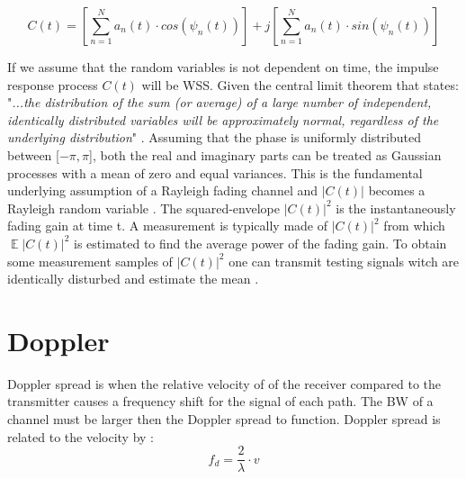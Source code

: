 \begin{equation}\label{eq:inf_reyl_impulse_response}
C(t) = \left [ \sum_{n =1}^{N} a_n(t)\cdot cos(\psi_n (t))\right ] + j\left [\sum_{n =1}^{N} a_n(t)\cdot sin(\psi_n (t))  \right ]
\end{equation}
\begin{where}
\end{where}

If we assume that the random variables is not dependent on time, the impulse response process $C(t)$ will be \gls{WSS}. Given the central limit theorem that states:
"\textit{...the distribution of the sum (or average) of a large number of independent, identically distributed variables will be approximately normal, regardless of the underlying distribution}" \citep{CentralLimit}.  
Assuming that the phase is uniformly distributed between [$-\pi,\pi$], both the real and imaginary parts can be treated as Gaussian processes with a mean of zero and equal variances. This is the fundamental underlying assumption of a Rayleigh fading channel and $ \left | C(t) \right | $ becomes a Rayleigh random variable \citep[p. 589]{Wireless_CommunicationsBook}. The squared-envelope $ \left | C(t) \right |^2 $ is the instantaneously fading gain at time t. A measurement is typically made of $ \left | C(t) \right |^2 $ from which $ \mathop{\mathbb{E}}\left | C(t) \right |^2 $ is estimated to find the average power of the fading gain. To obtain some measurement samples of $ \left | C(t) \right |^2 $ one can transmit testing signals witch are identically disturbed and estimate the mean \citep{MeasurementComplexRay}.




\section{Doppler}
Doppler spread is when the relative velocity of of the receiver compared to the transmitter causes a frequency shift for the signal of each path. The \gls{BW} of a channel must be larger then the Doppler spread to function. Doppler spread is related to the velocity by \citep[p. 229]{Wireless_CommunicationsBook}:
\begin{equation}
f_d = \frac{2}{\lambda} \cdot v
\end{equation}
\begin{where}
\end{where}

